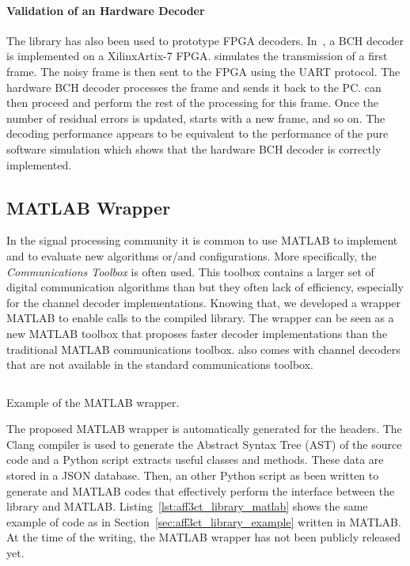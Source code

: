 \paragraph{Validation of an Hardware Decoder}

The \AFFECT library has also been used to prototype FPGA decoders.
In~\cite{Cassagne2017a}, a BCH decoder is implemented on a Xilinx\R Artix-7
FPGA. \AFFECT simulates the transmission of a first frame. The noisy frame is
then sent to the FPGA using the UART protocol. The hardware BCH decoder
processes the frame and sends it back to the PC. \AFFECT can then proceed and
perform the rest of the processing for this frame. Once the number of residual
errors is updated, \AFFECT starts with a new frame, and so on. The decoding
performance appears to be equivalent to the performance of the pure software
simulation which shows that the hardware BCH decoder is correctly implemented.

\subsection{MATLAB Wrapper}

In the signal processing community it is common to use MATLAB to implement and
to evaluate new algorithms or/and configurations. More specifically, the
\emph{Communications Toolbox} is often used. This toolbox contains a larger set
of digital communication algorithms than \AFFECT but they often lack of
efficiency, especially for the channel decoder implementations. Knowing that,
we developed a wrapper MATLAB to enable calls to the compiled \AFFECT library.
The wrapper can be seen as a new MATLAB toolbox that proposes faster decoder
implementations than the traditional MATLAB communications toolbox. \AFFECT
also comes with channel decoders that are not available in the standard
communications toolbox.

\begin{listing}[htp]
  \inputminted[frame=lines,linenos]{matlab}{\curChapter/src/use_cases/library/repetition_chain.m}
  \caption{Example of the \AFFECT MATLAB wrapper.}
  \label{lst:aff3ct_library_matlab}
\end{listing}

The proposed MATLAB wrapper is automatically generated for the \AFFECT headers.
The Clang compiler is used to generate the Abstract Syntax Tree (AST) of the
\AFFECT source code and a Python script extracts useful classes and methods.
These data are stored in a JSON database. Then, an other Python script as been
written to generate \Cxx and MATLAB codes that effectively perform the interface
between the \AFFECT library and MATLAB. Listing~\ref{lst:aff3ct_library_matlab}
shows the same example of code as in Section~\ref{sec:aff3ct_library_example}
written in MATLAB. At the time of the writing, the MATLAB wrapper has not been
publicly released yet.


